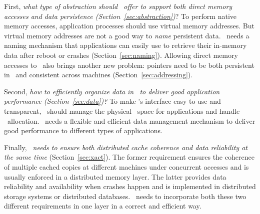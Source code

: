 First, {\em what type of abstraction should \dsnvm\ offer to support both direct memory accesses and data persistence (Section~\ref{sec:abstraction})}?
To perform native memory accesses, application processes should use virtual memory addresses. 
But virtual memory addresses are not a good way to {\em name} persistent data.
\dsnvm\ needs a naming mechanism that applications can easily use to retrieve their in-memory data after reboot or crashes (Section~\ref{sec:naming}).
Allowing direct memory accesses to \dsnvm\ also brings another new problem:
pointers need to be both persistent in \nvm\ and consistent across machines (Section~\ref{sec:addressing}).

Second, {\em how to efficiently organize data in \dsnvm\ to deliver good application performance (Section~\ref{sec:data})?}
To make \dsnvm's interface easy to use and transparent, 
\dsnvm\ should manage the physical \nvm\ space for applications and handle \nvm\ allocation.
\dsnvm\ needs a flexible and efficient data management mechanism to deliver good performance to different types of applications.

Finally, {\em \dsnvm\ needs to ensure both distributed cache coherence and data reliability at the same time} (Section~\ref{sec:xact}).
The former requirement ensures the coherence of multiple cached copies at different machines under concurrent accesses and is usually enforced in a distributed memory layer.
The latter provides data reliability and availability when crashes happen and is implemented in distributed storage systems or distributed databases.
\dsnvm\ needs to incorporate both these two different requirements in one layer in a correct and efficient way.
